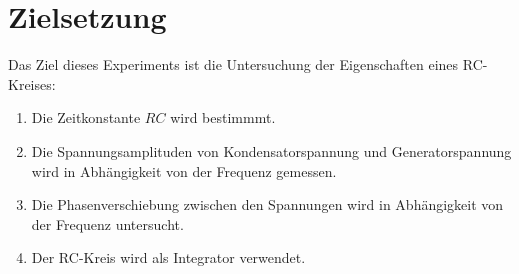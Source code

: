 \section{Zielsetzung}
\label{sec:Zielsetzung}


Das Ziel dieses Experiments ist die Untersuchung der Eigenschaften eines RC-Kreises:
\begin{enumerate}[label=\alph*)]
    \item Die Zeitkonstante $RC$ wird bestimmmt.
    \item Die Spannungsamplituden von Kondensatorspannung und Generatorspannung wird in Abhängigkeit von der Frequenz gemessen.
    \item Die Phasenverschiebung zwischen den Spannungen wird in Abhängigkeit von der Frequenz untersucht.
    \item Der RC-Kreis wird als Integrator verwendet.
\end{enumerate}
